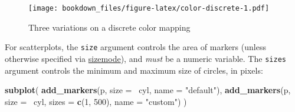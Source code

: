 \documentclass[12pt,]{isuthesis}
\newenvironment{Shaded}{\begin{snugshade}}{\end{snugshade}}
\newcommand{\KeywordTok}[1]{\textcolor[rgb]{0.13,0.29,0.53}{\textbf{{#1}}}}
\newcommand{\DataTypeTok}[1]{\textcolor[rgb]{0.13,0.29,0.53}{{#1}}}
\newcommand{\DecValTok}[1]{\textcolor[rgb]{0.00,0.00,0.81}{{#1}}}
\newcommand{\StringTok}[1]{\textcolor[rgb]{0.31,0.60,0.02}{{#1}}}
\newcommand{\OtherTok}[1]{\textcolor[rgb]{0.56,0.35,0.01}{{#1}}}
\newcommand{\NormalTok}[1]{{#1}}
\begin{document}
\begin{Shaded}
\end{Shaded}

\begin{figure}[htbp]
\centering
\texttt{[image: bookdown\_files/figure-latex/color-discrete-1.pdf]}
\caption{\label{fig:color-discrete}Three variations on a discrete color
mapping}
\end{figure}

For scatterplots, the \texttt{size} argument controls the area of
markers (unless otherwise specified via
\href{https://plot.ly/r/reference/\#scatter-marker-sizemode}{sizemode}),
and \emph{must} be a numeric variable. The \texttt{sizes} argument
controls the minimum and maximum size of circles, in pixels:

\begin{Shaded}
\begin{Highlighting}[]
\KeywordTok{subplot}\NormalTok{(}
  \KeywordTok{add_markers}\NormalTok{(p, }\DataTypeTok{size =} \NormalTok{~cyl, }\DataTypeTok{name =} \StringTok{"default"}\NormalTok{),}
  \KeywordTok{add_markers}\NormalTok{(p, }\DataTypeTok{size =} \NormalTok{~cyl, }\DataTypeTok{sizes =} \KeywordTok{c}\NormalTok{(}\DecValTok{1}\NormalTok{, }\DecValTok{500}\NormalTok{), }\DataTypeTok{name =} \StringTok{"custom"}\NormalTok{)}
\NormalTok{)}
\end{Highlighting}
\end{Shaded}
\end{document}

